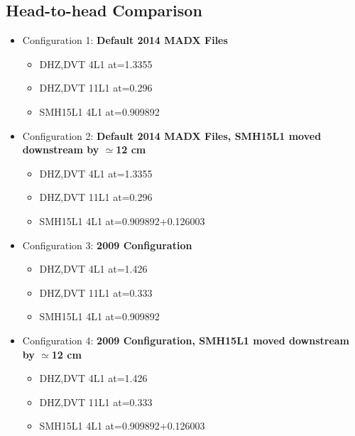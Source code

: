\documentclass[11pt,letter,english]{article}
\begin{document}
\subsection*{Head-to-head Comparison}

\begin{itemize}

\item Configuration 1: {\bf Default 2014 MADX Files}
  \begin{itemize}
  \item DHZ,DVT 4L1 at=1.3355 
  \item DHZ,DVT 11L1 at=0.296 
  \item SMH15L1 4L1 at=0.909892 
  \end{itemize}
\item Configuration 2: {\bf Default 2014 MADX Files, SMH15L1 moved downstream by $\simeq$12 cm}
  \begin{itemize}
  \item DHZ,DVT 4L1 at=1.3355 
  \item DHZ,DVT 11L1 at=0.296 
  \item SMH15L1 4L1 at=0.909892+0.126003
  \end{itemize}

\item Configuration 3: {\bf 2009 Configuration}
  \begin{itemize}
  \item DHZ,DVT 4L1 at=1.426 
  \item DHZ,DVT 11L1 at=0.333 
  \item SMH15L1 4L1 at=0.909892 
  \end{itemize}
\item Configuration 4: {\bf 2009 Configuration, SMH15L1 moved downstream by $\simeq$12 cm}
  \begin{itemize}
  \item DHZ,DVT 4L1 at=1.426 
  \item DHZ,DVT 11L1 at=0.333 
  \item SMH15L1 4L1 at=0.909892+0.126003 
  \end{itemize}

\end{itemize}
\end{document}
